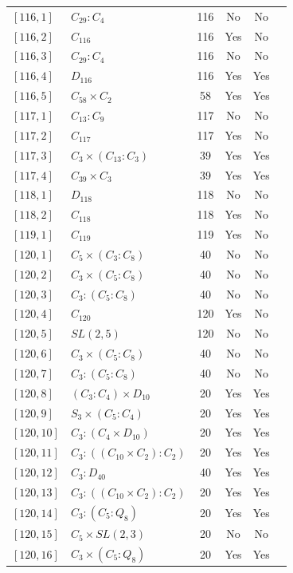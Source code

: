\documentclass[12pt, a4paper]{article}
\theoremstyle{plain}
\theoremstyle{definition}
\begin{document}
\begin{longtable}{llcccl}
  $[116,1]$ & $C_{29} : C_4$ & 116 & No & No \\
  $[116,2]$ & $C_{116}$ & 116 & Yes & No \\
  $[116,3]$ & $C_{29} : C_4$ & 116 & No & No \\
  $[116,4]$ & $D_{116}$ & 116 & Yes & Yes \\
  $[116,5]$ & $C_{58} \times C_2$ & 58 & Yes & Yes \\
  $[117,1]$ & $C_{13} : C_9$ & 117 & No & No \\
  $[117,2]$ & $C_{117}$ & 117 & Yes & No \\
  $[117,3]$ & $C_3 \times (C_{13} : C_3)$ & 39 & Yes & Yes \\
  $[117,4]$ & $C_{39} \times C_3$ & 39 & Yes & Yes \\
  $[118,1]$ & $D_{118}$ & 118 & No & No \\
  $[118,2]$ & $C_{118}$ & 118 & Yes & No \\
  $[119,1]$ & $C_{119}$ & 119 & Yes & No \\
  $[120,1]$ & $C_5 \times (C_3 : C_8)$ & 40 & No & No \\
  $[120,2]$ & $C_3 \times (C_5 : C_8)$ & 40 & No & No \\
  $[120,3]$ & $C_3 : (C_5 : C_8)$ & 40 & No & No \\
  $[120,4]$ & $C_{120}$ & 120 & Yes & No \\
  $[120,5]$ & $SL(2,5)$ & 120 & No & No \\
  $[120,6]$ & $C_3 \times (C_5 : C_8)$ & 40 & No & No \\
  $[120,7]$ & $C_3 : (C_5 : C_8)$ & 40 & No & No \\
  $[120,8]$ & $(C_3 : C_4) \times D_{10}$ & 20 & Yes & Yes \\
  $[120,9]$ & $S_3 \times (C_5 : C_4)$ & 20 & Yes & Yes \\
  $[120,10]$ & $C_3 : (C_4 \times D_{10})$ & 20 & Yes & Yes \\
  $[120,11]$ & $C_3 : ((C_{10} \times C_2) : C_2)$ & 20 & Yes & Yes \\
  $[120,12]$ & $C_3 : D_{40}$ & 40 & Yes & Yes \\
  $[120,13]$ & $C_3 : ((C_{10} \times C_2) : C_2)$ & 20 & Yes & Yes \\
  $[120,14]$ & $C_3 : (C_5 : Q_8)$ & 20 & Yes & Yes \\
  $[120,15]$ & $C_5 \times SL(2,3)$ & 20 & No & No \\
  $[120,16]$ & $C_3 \times (C_5 : Q_8)$ & 20 & Yes & Yes \\

\end{longtable}
\end{document}

